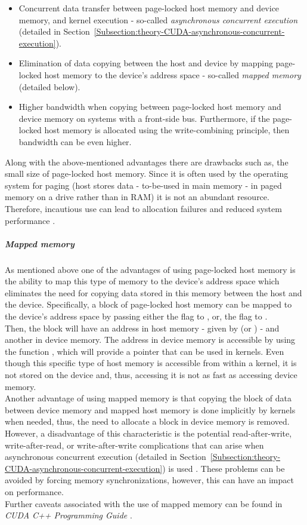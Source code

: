 \begin{itemize}
	\item Concurrent data transfer between page-locked host memory and device memory, and kernel execution - so-called \textit{asynchronous concurrent execution} (detailed in Section~\ref{Subsection:theory-CUDA-asynchronous-concurrent-execution}).
	\item Elimination of data copying between the host and device by mapping page-locked host memory to the device's address space - so-called \textit{mapped memory} (detailed below).
	\item Higher bandwidth when copying between page-locked host memory and device memory on systems with a front-side bus. Furthermore, if the page-locked host memory is allocated using the write-combining principle, then bandwidth can be even higher.
\end{itemize}

Along with the above-mentioned advantages there are drawbacks such as, the small size of page-locked host memory. Since it is often used by the operating system for paging (host stores data - to-be-used in main memory - in paged memory on a drive rather than in RAM) it is not an abundant resource. Therefore, incautious use can lead to allocation failures and reduced system performance \cite{NVIDIAMay2022}.

\subparagraph{Mapped memory}
As mentioned above one of the advantages of using page-locked host memory is the ability to map this type of memory to the device's address space which eliminates the need for copying data stored in this memory between the host and the device. Specifically, a block of page-locked host memory can be mapped to the device's address space by passing either the  flag to , or, the  flag to  \cite{NVIDIAMay2022}. \\
Then, the block will have an address in host memory - given by  (or ) - and another in device memory. The address in device memory is accessible by using the function , which will provide a pointer that can be used in kernels. Even though this specific type of host memory is accessible from within a kernel, it is not stored on the device and, thus, accessing it is not as fast as accessing device memory. \\
Another advantage of using mapped memory is that copying the block of data between device memory and mapped host memory is done implicitly by kernels when needed, thus, the need to allocate a block in device memory is removed. However, a disadvantage of this characteristic is the potential read-after-write, write-after-read, or write-after-write complications that can arise when asynchronous concurrent execution (detailed in Section~\ref{Subsection:theory-CUDA-asynchronous-concurrent-execution}) is used \cite{NVIDIAMay2022}. These problems can be avoided by forcing memory synchronizations, however, this can have an impact on performance. \\
Further caveats associated with the use of mapped memory can be found in \emph{CUDA C++ Programming Guide} \cite{NVIDIAMay2022}.

